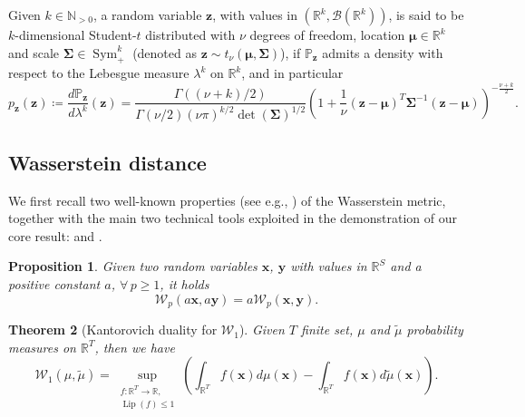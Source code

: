 \documentclass[a4paper, 11pt, reqno]{amsart}
\newcommand{\citet}[2][]{\citeauthor{#2} \cite[#1]{#2}}
\theoremstyle{plain}
\newtheorem{theorem}{Theorem}[section]
\newtheorem{proposition}[theorem]{Proposition}
\theoremstyle{remark}
\theoremstyle{definition}
\newcommand{\tstud}[3]{t_{#1}\left(#2, #3\right)}
\newcommand{\wass}[3][2]{\mathcal{W}_{#1}\left(#2, #3\right)}
\newcommand{\real}{\mathbb{R}}
\renewcommand{\natural}{\mathbb{N}}
\newcommand{\borel}[1]{\mathcal{B}\left(#1\right)}
\newcommand{\lipschitz}[1]{\operatorname{Lip}\left(#1\right)}
\renewcommand{\det}[1]{\operatorname{det}\left(#1\right)}
\let\oldforall\forall
\renewcommand{\forall}{\oldforall\,}
\begin{document}
Given $k \in \natural_{> 0}$, a random variable $\bm{z}$, with values in $\left(\real^k, \borel{\real^k}\right)$, is said to be $k$-dimensional Student-$t$ distributed with $\nu$ degrees of freedom, location $\bm{\mu} \in \real^k$ and scale $\bm{\Sigma} \in \operatorname{Sym}_+^{k}$ (denoted as $\bm{z} \sim \tstud{\nu}{\bm{\mu}}{\bm{\Sigma}}$), if $\mathbb{P}_{\bm{z}}$ admits a density with respect to the Lebesgue measure $\lambda^k$ on $\real^k$, and in particular
\begin{equation*}
	p_{\bm{z}}(\bm{z}) \coloneqq \frac{d\mathbb{P}_{\bm{z}}}{d\lambda^k}(\bm{z}) = \frac{\Gamma((\nu + k)/2)}{\Gamma(\nu/2) (\nu \pi)^{k/2} \det{\bm{\Sigma}}^{1/2}} \left(1 + \frac{1}{\nu} (\bm{z} - \bm{\mu})^T \bm{\Sigma}^{-1} (\bm{z} - \bm{\mu})\right)^{-\frac{\nu + k}{2}}.
\end{equation*}

\subsection{Wasserstein distance} \label{subsec:wassdist}

We first recall two well-known properties (see e.g., \citet{otvillani2008}) of the Wasserstein metric, together with the main two technical tools exploited in the demonstration of our core result:  and .

\begin{proposition} \label{prop:wassmult}
	Given two random variables $\bm{x}$, $\bm{y}$ with values in $\real^S$ and a positive constant $a$, $\forall p \geq 1$, it holds
	\begin{equation} \label{eq:wasslinear}
		\wass[p]{a \bm{x}}{a \bm{y}} = a \wass[p]{\bm{x}}{\bm{y}}.
	\end{equation}
\end{proposition}

\begin{theorem}[Kantorovich duality for $\mathcal{W}_1$] \label{thm:kantorovichduality}
	Given $T$ finite set, $\mu$ and $\widetilde{\mu}$ probability measures on $\real^T$, then we have
	\begin{equation} \label{eq:kantorovichduality}
		\wass[1]{\mu}{\widetilde{\mu}} = \sup_{\substack{f: \real^T \to \real, \\ \lipschitz{f} \leq 1}} \left(\int_{\real^T} f(\bm{x}) d\mu(\bm{x}) - \int_{\real^T} f(\bm{x}) d\widetilde{\mu}(\bm{x})\right). 
	\end{equation}
\end{theorem}
\end{document}
